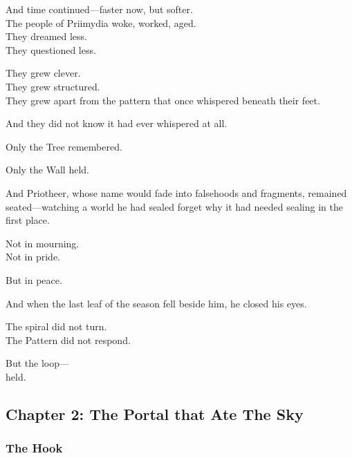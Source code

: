 \documentclass[12pt]{article}
\begin{document}
\vspace{0.5em}
And time continued---faster now, but softer.\\
The people of Priimydia woke, worked, aged.\\
They dreamed less.\\
They questioned less.

\vspace{0.5em}
They grew clever.\\
They grew structured.\\
They grew apart from the pattern that once whispered beneath their feet.

\vspace{0.5em}
And they did not know it had ever whispered at all.

\vspace{0.5em}
Only the Tree remembered.

\vspace{0.5em}
Only the Wall held.

\vspace{0.5em}
And Priotheer, whose name would fade into falsehoods and fragments, remained seated---watching a world he had sealed forget why it had needed sealing in the first place.

\vspace{0.5em}
Not in mourning.\\
Not in pride.

\vspace{0.5em}
But in peace.

\vspace{0.5em}
And when the last leaf of the season fell beside him, he closed his eyes.

\vspace{0.5em}
The spiral did not turn.\\
The Pattern did not respond.

\vspace{0.5em}
But the loop---\\
held.

\newpage

\subsection*{Chapter 2: The Portal that Ate The Sky}

\vspace{.5in}

\subsubsection*{The Hook}
\end{document}

